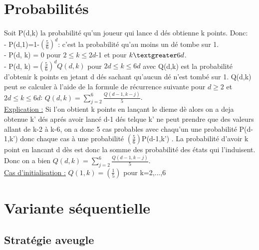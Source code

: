 \documentclass{article}
\begin{document}
\section{Probabilités}
\paragraph{}
    \begin{large}
        Soit P(d,k) la probabilité qu'un joueur qui lance d dés obtienne k points. Donc:\\
        - P(d,1)=1-$(\frac{5}{6})^{d}$: c'est la probabilité qu'au moins un dé tombe sur 1.\\
        - P(d, k) = 0 pour $2 \le k \le 2d$-1 et pour $k \textgreater 6d$.\\
        - P(d, k) =$(\frac{5}{6})^{d}Q(d,k)$ pour $2d \le k \le 6d$ avec Q(d,k) est la probabilité d'obtenir k points en jetant d dés sachant qu'aucun dé n'est tombé sur 1. Q(d,k) peut se calculer à l'aide de la formule de récurrence suivante pour $d \ge 2$ et $2d \le k \le 6d$: $Q(d,k)= \sum_{j=2}^{6} \frac{Q(d-1,k-j)}{5}$.\\
        
        \underline{Explication :} Si l'on obtient k points en lançant le dieme dè alors on a deja obtenue k' dés aprés avoir lancé d-1 dés telque k' ne peut prendre que des valeurs allant de k-2 à k-6, on a donc 5 cas probables avec chaqu'un une probabilité P(d-1,k') donc chaque cas à une probabilité $(\frac{5}{6})$P(d-1,k') . La probabilité d'avoir k point en lancant d dès est donc la somme des probabilité des états qui l'induisent. Donc on a bien $Q(d,k)= \sum_{j=2}^{6} \frac{Q(d-1,k-j)}{5}$.\\
        
        \underline{Cas d'initialisation :} $Q(1,k)=(\frac{1}{5})$ pour k=2,...,6
    \end{large}
    
\section{Variante séquentielle}

\subsection{Stratégie aveugle}
\end{document}
